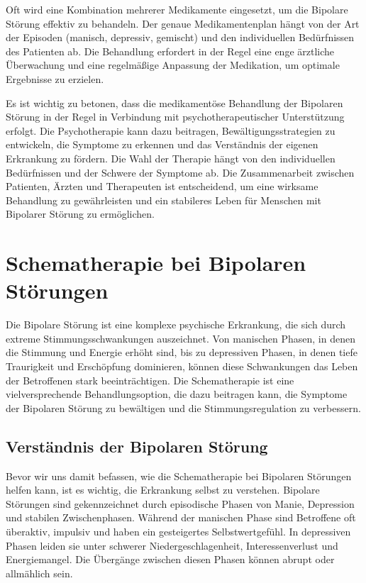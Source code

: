 Oft wird eine Kombination mehrerer Medikamente eingesetzt, um die Bipolare Störung effektiv zu behandeln. Der genaue Medikamentenplan hängt von der Art der Episoden (manisch, depressiv, gemischt) und den individuellen Bedürfnissen des Patienten ab. Die Behandlung erfordert in der Regel eine enge ärztliche Überwachung und eine regelmäßige Anpassung der Medikation, um optimale Ergebnisse zu erzielen.

Es ist wichtig zu betonen, dass die medikamentöse Behandlung der Bipolaren Störung in der Regel in Verbindung mit psychotherapeutischer Unterstützung erfolgt. Die Psychotherapie kann dazu beitragen, Bewältigungsstrategien zu entwickeln, die Symptome zu erkennen und das Verständnis der eigenen Erkrankung zu fördern. Die Wahl der Therapie hängt von den individuellen Bedürfnissen und der Schwere der Symptome ab. Die Zusammenarbeit zwischen Patienten, Ärzten und Therapeuten ist entscheidend, um eine wirksame Behandlung zu gewährleisten und ein stabileres Leben für Menschen mit Bipolarer Störung zu ermöglichen.


\section{Schematherapie bei Bipolaren Störungen}

Die Bipolare Störung ist eine komplexe psychische Erkrankung, die sich durch extreme Stimmungsschwankungen auszeichnet. Von manischen Phasen, in denen die Stimmung und Energie erhöht sind, bis zu depressiven Phasen, in denen tiefe Traurigkeit und Erschöpfung dominieren, können diese Schwankungen das Leben der Betroffenen stark beeinträchtigen. Die Schematherapie ist eine vielversprechende Behandlungsoption, die dazu beitragen kann, die Symptome der Bipolaren Störung zu bewältigen und die Stimmungsregulation zu verbessern.

\subsection{Verständnis der Bipolaren Störung}

Bevor wir uns damit befassen, wie die Schematherapie bei Bipolaren Störungen helfen kann, ist es wichtig, die Erkrankung selbst zu verstehen. Bipolare Störungen sind gekennzeichnet durch episodische Phasen von Manie, Depression und stabilen Zwischenphasen. Während der manischen Phase sind Betroffene oft überaktiv, impulsiv und haben ein gesteigertes Selbstwertgefühl. In depressiven Phasen leiden sie unter schwerer Niedergeschlagenheit, Interessenverlust und Energiemangel. Die Übergänge zwischen diesen Phasen können abrupt oder allmählich sein.


